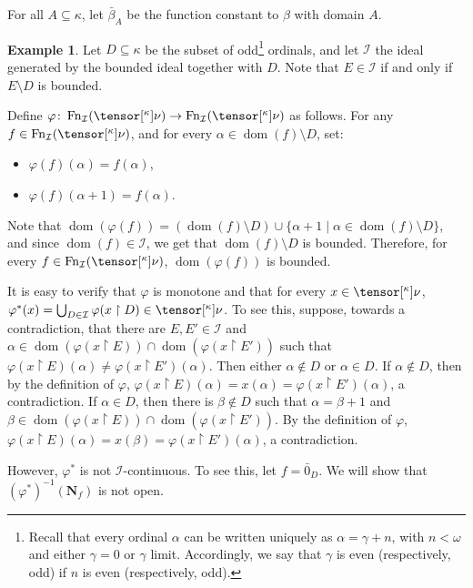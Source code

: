 \documentclass{amsart}
\numberwithin{equation}{section}
\newcommand{\B}{\mathcal{B}}
\newcommand{\I}{\mathcal{I}}
\newcommand{\pre}[2]{\tensor[^{#1}]{#2}{}}
\newcommand{\Nbhd}{\boldsymbol{N}}
\newcommand{\1}{\mathbf{I}}
\newcommand{\2}{\mathbf{II}}
\renewcommand{\a}{\alpha}
\newcommand{\g}{\gamma}
\renewcommand{\k}{\kappa}
\renewcommand{\phi}{\varphi}
\renewcommand{\o}{\omega}
\DeclareMathOperator{\dom}{dom}
\DeclareMathOperator{\Fn}{Fn}
\theoremstyle{definition}
\newtheorem{example}[theorem]{Example}
\theoremstyle{remark}
\begin{document}
For all $A\subseteq\kappa$, let $\bar\beta_A$ be the function constant to $\beta$ with domain $A$. 



\begin{example}\label{example_cont}
 Let $D\subseteq\k$ be the subset of odd{}\footnote{Recall that every ordinal \(\a\) can be written uniquely as \(\a=\g+n\), with \(n<\o\) and either \(\g=0\) or \(\g\) limit. Accordingly, we say that \(\g\) is even (respectively, odd)
if \(n\) is even (respectively, odd).} ordinals, and let $\I$ the ideal generated by the bounded ideal together with \(D\). Note that \(E \in \I\) if and only if \(E \setminus D \) is bounded. %
 
 Define $\varphi \colon \Fn_\I( \pre{\k}{\nu} ) \to \Fn_\I( \pre{\k}{\nu} )$ as follows. For any \(f \in \Fn_\I( \pre{\k}{\nu} )\), and for every $\alpha\in \dom (f)\setminus D$, set:
 \begin{itemize}
     \item $\varphi(f)(\alpha)=f(\alpha)$,
     \item $\varphi(f)(\alpha+1)=f(\alpha)$. 
 \end{itemize}
 Note that $\dom (\varphi(f))=(\dom (f)\setminus D)\cup \{\alpha+1\mid \alpha\in \dom (f)\setminus D\}$, and since \(\dom(f) \in \I\), we get that \(\dom (f)\setminus D\) is bounded. Therefore, for every $f\in \Fn_\I( \pre{\k}{\nu} )$, $\dom (\varphi(f))$ is bounded.
 
It is easy to verify that \(\phi\) is monotone and that for every \(x \in \pre{\k}{\nu}\), \(\phi^*(x)=\bigcup_{D\in \I}\phi(x\restriction D) \in \pre{\k}{\nu}\). To see this, suppose, towards a contradiction, that there are $E,E'\in \I$ and $\alpha\in \dom(\phi(x\restriction E))\cap \dom(\phi(x\restriction E'))$ such that $\phi(x\restriction E)(\alpha)\neq\phi(x\restriction E')(\alpha)$. Then either $\alpha\notin D$ or $\alpha\in D$. If $\alpha\notin D$, then by the definition of $\phi$, $\phi(x\restriction E)(\alpha)=x(\alpha)=\phi(x\restriction E')(\alpha)$, a contradiction. If $\alpha\in D$, then there is $\beta\notin D$ such that $\alpha=\beta+1$ and $\beta\in \dom(\phi(x\restriction E))\cap \dom(\phi(x\restriction E'))$. By the definition of $\phi$, $\phi(x\restriction E)(\alpha)=x(\beta)=\phi(x\restriction E')(\alpha)$, a contradiction.

However, $\varphi^*$ is not \(\I\)-continuous. %
To see this, let $f=\bar0_D$. We will show that $(\phi^*)^{-1}(\Nbhd_f)$ is not open. 


\end{example}
\end{document}
